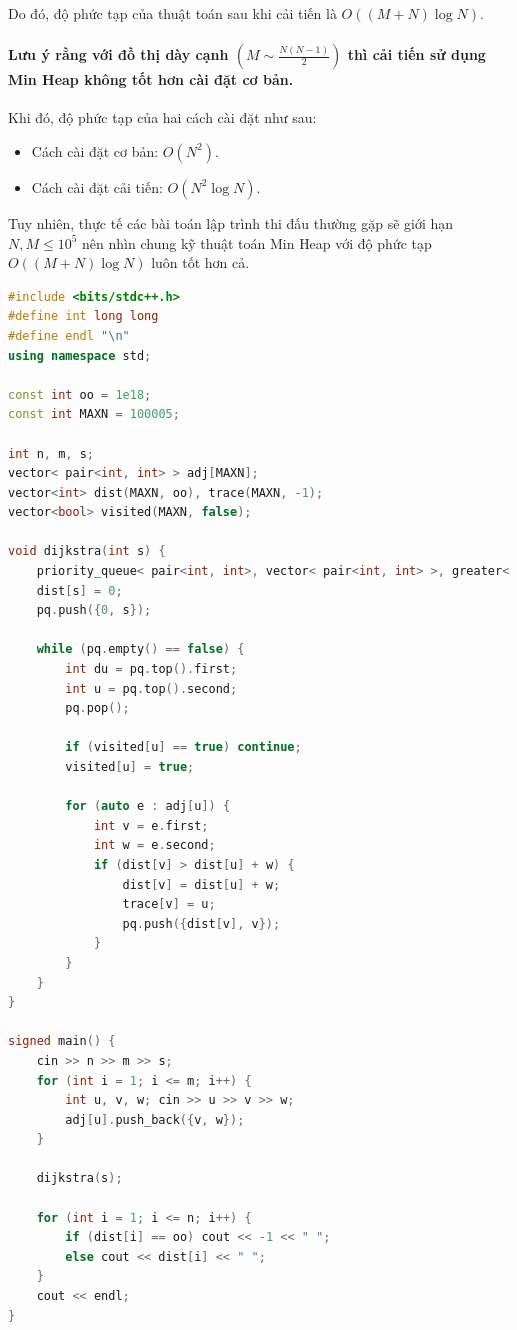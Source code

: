 \noindent
Do đó, độ phức tạp của thuật toán sau khi cải tiến là $O((M + N)\log N)$.

\paragraph{Lưu ý rằng với đồ thị dày cạnh $\left(M \sim \frac{N(N-1)}{2}\right)$ thì cải tiến sử dụng Min Heap không tốt hơn cài đặt cơ bản.} Khi đó, độ phức tạp của hai cách cài đặt như sau:
\begin{itemize}
    \item Cách cài đặt cơ bản: $O(N^2)$.
    \item Cách cài đặt cải tiến: $O(N^2 \log N)$.
\end{itemize}

Tuy nhiên, thực tế các bài toán lập trình thi đấu thường gặp sẽ giới hạn $N, M \leq 10^5$ nên nhìn chung kỹ thuật toán Min Heap với độ phức tạp $O((M + N)\log N)$ luôn tốt hơn cả.

\begin{lstlisting}[language=C++,caption={Cài đặt}]
#include <bits/stdc++.h>
#define int long long
#define endl "\n"
using namespace std;

const int oo = 1e18;
const int MAXN = 100005;

int n, m, s;
vector< pair<int, int> > adj[MAXN];
vector<int> dist(MAXN, oo), trace(MAXN, -1);
vector<bool> visited(MAXN, false);

void dijkstra(int s) {
    priority_queue< pair<int, int>, vector< pair<int, int> >, greater< pair<int, int> > > pq;
    dist[s] = 0;
    pq.push({0, s});

    while (pq.empty() == false) {
        int du = pq.top().first;
        int u = pq.top().second;
        pq.pop();

        if (visited[u] == true) continue;
        visited[u] = true;

        for (auto e : adj[u]) {
            int v = e.first;
            int w = e.second;
            if (dist[v] > dist[u] + w) {
                dist[v] = dist[u] + w;
                trace[v] = u;
                pq.push({dist[v], v});
            }
        }
    }
}

signed main() {
    cin >> n >> m >> s;
    for (int i = 1; i <= m; i++) {
        int u, v, w; cin >> u >> v >> w;
        adj[u].push_back({v, w});
    }

    dijkstra(s);

    for (int i = 1; i <= n; i++) {
        if (dist[i] == oo) cout << -1 << " ";
        else cout << dist[i] << " ";
    }
    cout << endl;
}
\end{lstlisting}

